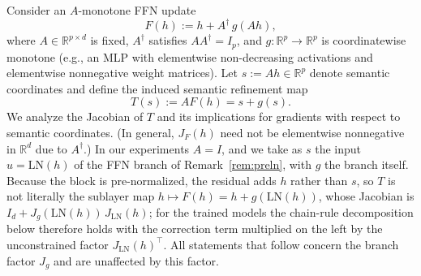 \documentclass{article}
\theoremstyle{plain}
\theoremstyle{definition}
\theoremstyle{remark}
\theoremstyle{plain}
\begin{document}
Consider an $A$-monotone FFN update
\[
F(h) := h + A^\dagger\, g(Ah),
\]
where $A\in\mathbb{R}^{p\times d}$ is fixed, $A^\dagger$ satisfies $AA^\dagger=I_p$,
and $g:\mathbb{R}^p\to\mathbb{R}^p$ is coordinatewise monotone (e.g., an MLP with
elementwise non-decreasing activations and elementwise nonnegative weight matrices).
Let $s := Ah \in \mathbb{R}^p$ denote semantic coordinates and define the induced
semantic refinement map
\[
T(s) := A F(h) = s + g(s).
\]
We analyze the Jacobian of $T$ and its implications for gradients with respect to
semantic coordinates. (In general, $J_F(h)$ need not be elementwise nonnegative in
$\mathbb{R}^d$ due to $A^\dagger$.)
In our experiments $A = I$, and we take as $s$ the input $u = \mathrm{LN}(h)$ of the FFN branch of
Remark~\ref{rem:preln}, with $g$ the branch itself. Because the block is
pre-normalized, the residual adds $h$ rather than $s$, so $T$ is not literally the
sublayer map $h \mapsto F(h) = h + g(\mathrm{LN}(h))$, whose Jacobian is
$I_d + J_g(\mathrm{LN}(h))\,J_{\mathrm{LN}}(h)$; for the trained models the chain-rule
decomposition below therefore holds with the correction term multiplied on the left by
the unconstrained factor $J_{\mathrm{LN}}(h)^{\top}$. All statements that follow concern
the branch factor $J_g$ and are unaffected by this factor.




\end{document}
